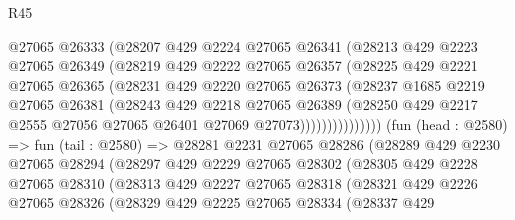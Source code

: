 \begin{lexlean}{R45}
\begin{coremodule}
                      @27065
                      @26333
                      (@28207
                        @429
                        @2224
                        @27065
                        @26341
                        (@28213
                          @429
                          @2223
                          @27065
                          @26349
                          (@28219
                            @429
                            @2222
                            @27065
                            @26357
                            (@28225
                              @429
                              @2221
                              @27065
                              @26365
                              (@28231
                                @429
                                @2220
                                @27065
                                @26373
                                (@28237
                                  @1685
                                  @2219
                                  @27065
                                  @26381
                                  (@28243
                                    @429
                                    @2218
                                    @27065
                                    @26389
                                    (@28250
                                      @429
                                      @2217
                                      @2555
                                      @27056
                                      @27065
                                      @26401
                                      @27069
                                      @27073)))))))))))))))
        (fun (head : @2580) =>
        fun (tail : @2580) =>
        @28281
          @2231
          @27065
          @28286
          (@28289
            @429
            @2230
            @27065
            @28294
            (@28297
              @429
              @2229
              @27065
              @28302
              (@28305
                @429
                @2228
                @27065
                @28310
                (@28313
                  @429
                  @2227
                  @27065
                  @28318
                  (@28321
                    @429
                    @2226
                    @27065
                    @28326
                    (@28329
                      @429
                      @2225
                      @27065
                      @28334
                      (@28337
                        @429

\end{coremodule}
\end{lexlean}
